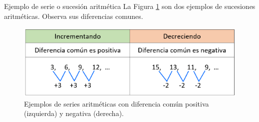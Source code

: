 \begin{infocard}{Ejemplo de serie o sucesión aritmética}
    La Figura \ref{fig:20230320164417} son dos ejemplos de sucesiones aritméticas. Observa sus diferencias comunes.

    \begin{figure}[H]
        \centering
        \includegraphics[width=\linewidth]{../images/20230320164417}
        \caption{Ejemplos de series aritméticas con diferencia común positiva (izquierda) y negativa (derecha).}
        \label{fig:20230320164417}
    \end{figure}
\end{infocard}